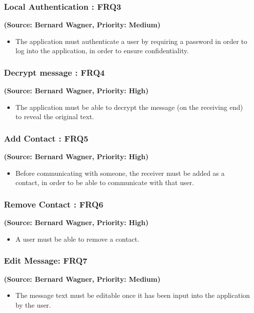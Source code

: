 \subsubsection{Local Authentication : FRQ3}%
\textbf{(Source: Bernard Wagner, Priority: Medium)}
\begin{itemize}
\item The application must authenticate a user by requiring a password in order to log into the application, in order to ensure confidentiality.
\end{itemize}
\subsubsection{Decrypt message : FRQ4}
\textbf{(Source: Bernard Wagner, Priority: High)}
\begin{itemize}
\item The application must be able to decrypt the message (on the receiving end) to reveal the original text.
\end{itemize}
\subsubsection{Add Contact : FRQ5}
\textbf{(Source: Bernard Wagner, Priority: High)}
\begin{itemize}
\item Before communicating with someone, the receiver must be added as a contact, in order to be able to communicate with that user.
\end{itemize}
\subsubsection{Remove Contact : FRQ6}
\textbf{(Source: Bernard Wagner, Priority: High)}
\begin{itemize}
\item A user must be able to remove a contact.
\end{itemize}
\subsubsection{Edit Message: FRQ7}
\textbf{(Source: Bernard Wagner, Priority: Medium)}
\begin{itemize}
\item The message text must be editable once it has been input into the application by the user.
\end{itemize}
